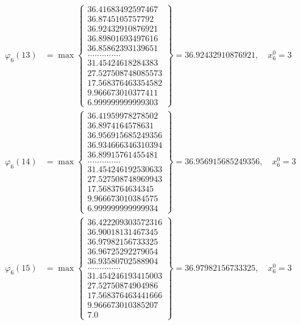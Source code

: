 \documentclass{article}
\begin{document}
\begin{align*}
  
  
  
\varphi_{6}(13) &= \max \left\{ \begin{array}{c}
36.41683492597467 \\
 36.8745105757792 \\
 36.92432910876921 \\
 36.89801693497616 \\
 36.85862393139651 \\
 .............. \\
 31.45424618284383 \\
 27.527508748085573 \\
 17.568376463354582 \\
 9.966673010377411 \\
 6.999999999999303
\end{array} \right\} = 36.92432910876921, \quad x_{6}^0 = 3\\
  
  
  
  
\varphi_{6}(14) &= \max \left\{ \begin{array}{c}
36.41959978278502 \\
 36.8974164578631 \\
 36.956915685249356 \\
 36.934666346310394 \\
 36.89915761455481 \\
 .............. \\
 31.454246192530633 \\
 27.527508748969943 \\
 17.5683764634345 \\
 9.966673010384575 \\
 6.999999999999934
\end{array} \right\} = 36.956915685249356, \quad x_{6}^0 = 3\\
  
  
  
  
\varphi_{6}(15) &= \max \left\{ \begin{array}{c}
36.422209303572316 \\
 36.90018131467345 \\
 36.97982156733325 \\
 36.96725292279054 \\
 36.93580702588904 \\
 .............. \\
 31.454246193415003 \\
 27.52750874904986 \\
 17.568376463441666 \\
 9.966673010385207 \\
 7.0
\end{array} \right\} = 36.97982156733325, \quad x_{6}^0 = 3\\
  

\end{align*}
\end{document}
